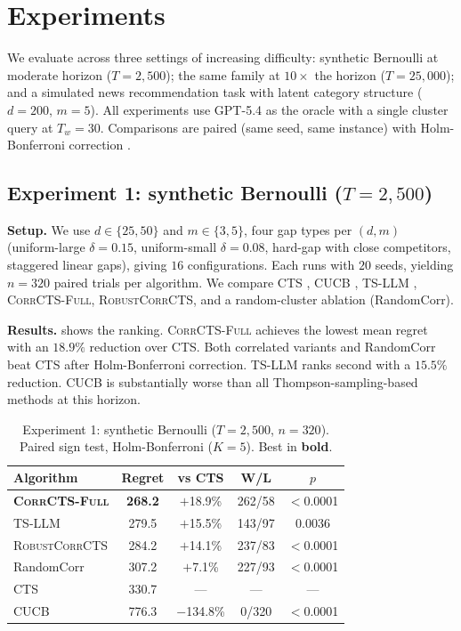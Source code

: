 \documentclass{article}
\theoremstyle{plain}
\theoremstyle{definition}
\theoremstyle{remark}
\newcommand{\CorrFull}{\textsc{CorrCTS-Full}}
\newcommand{\RobustCorr}{\textsc{RobustCorrCTS}}
\begin{document}
\section{Experiments}\label{sec:experiments}

We evaluate across three settings of increasing difficulty: synthetic Bernoulli at moderate horizon ($T{=}2{,}500$); the same family at $10\times$ the horizon ($T{=}25{,}000$); and a simulated news recommendation task with latent category structure ($d{=}200$, $m{=}5$).
All experiments use GPT-5.4 as the oracle with a single cluster query at $T_w = 30$.
Comparisons are paired (same seed, same instance) with Holm-Bonferroni correction \citep{holm1979simple}.

\subsection{Experiment 1: synthetic Bernoulli ($T{=}2{,}500$)}\label{sec:exp1}

\textbf{Setup.}
We use $d \in \{25, 50\}$ and $m \in \{3, 5\}$, four gap types per $(d,m)$ (uniform-large $\delta{=}0.15$, uniform-small $\delta{=}0.08$, hard-gap with close competitors, staggered linear gaps), giving $16$ configurations.
Each runs with $20$ seeds, yielding $n = 320$ paired trials per algorithm.
We compare CTS \citep{wang2018cts}, CUCB \citep{chen2013cucb}, TS-LLM \citep{sun2025tsllm}, \CorrFull{}, \RobustCorr{}, and a random-cluster ablation (RandomCorr).

\textbf{Results.}
 shows the ranking.
\CorrFull{} achieves the lowest mean regret with an $18.9\%$ reduction over CTS.
Both correlated variants and RandomCorr beat CTS after Holm-Bonferroni correction.
TS-LLM ranks second with a $15.5\%$ reduction.
CUCB is substantially worse than all Thompson-sampling-based methods at this horizon.

\begin{table}[t]
\caption{Experiment 1: synthetic Bernoulli ($T{=}2{,}500$, $n{=}320$). Paired sign test, Holm-Bonferroni ($K{=}5$). Best in \textbf{bold}.}
\label{tab:global}
\centering
\small
\begin{tabular}{@{}lcccc@{}}
\toprule
Algorithm & Regret & vs CTS & W/L & $p$ \\
\midrule
\textbf{\CorrFull{}} & \textbf{268.2} & $+$18.9\% & 262/58 & ${<}$0.0001 \\
TS-LLM & 279.5 & $+$15.5\% & 143/97 & 0.0036 \\
\RobustCorr{} & 284.2 & $+$14.1\% & 237/83 & ${<}$0.0001 \\
RandomCorr & 307.2 & $+$7.1\% & 227/93 & ${<}$0.0001 \\
CTS & 330.7 & --- & --- & --- \\
CUCB & 776.3 & $-$134.8\% & 0/320 & ${<}$0.0001 \\
\bottomrule
\end{tabular}
\end{table}
\end{document}
